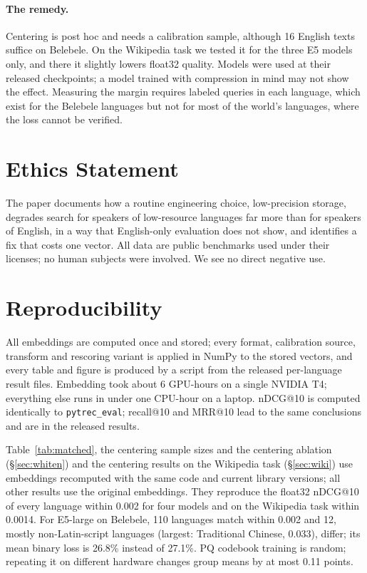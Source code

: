 \documentclass[11pt]{article}
\begin{document}
\paragraph{The remedy.} Centering is post hoc and needs a calibration sample, although 16 English texts suffice on Belebele. On the Wikipedia task we tested it for the three E5 models only, and there it slightly lowers float32 quality. Models were used at their released checkpoints; a model trained with compression in mind may not show the effect. Measuring the margin requires labeled queries in each language, which exist for the Belebele languages but not for most of the world's languages, where the loss cannot be verified.

\section*{Ethics Statement}
The paper documents how a routine engineering choice, low-precision storage, degrades search for speakers of low-resource languages far more than for speakers of English, in a way that English-only evaluation does not show, and identifies a fix that costs one vector. All data are public benchmarks used under their licenses; no human subjects were involved. We see no direct negative use.



\appendix
\section{Reproducibility}\label{app:repro}
All embeddings are computed once and stored; every format, calibration source, transform and rescoring variant is applied in NumPy to the stored vectors, and every table and figure is produced by a script from the released per-language result files. Embedding took about 6 GPU-hours on a single NVIDIA T4; everything else runs in under one CPU-hour on a laptop. nDCG@10 is computed identically to \texttt{pytrec\_eval}; recall@10 and MRR@10 lead to the same conclusions and are in the released results.

Table~\ref{tab:matched}, the centering sample sizes and the centering ablation (\S\ref{sec:whiten}) and the centering results on the Wikipedia task (\S\ref{sec:wiki}) use embeddings recomputed with the same code and current library versions; all other results use the original embeddings. They reproduce the float32 nDCG@10 of every language within 0.002 for four models and on the Wikipedia task within 0.0014. For E5-large on Belebele, 110 languages match within 0.002 and 12, mostly non-Latin-script languages (largest: Traditional Chinese, 0.033), differ; its mean binary loss is 26.8\% instead of 27.1\%. PQ codebook training is random; repeating it on different hardware changes group means by at most 0.11 points.
\end{document}
